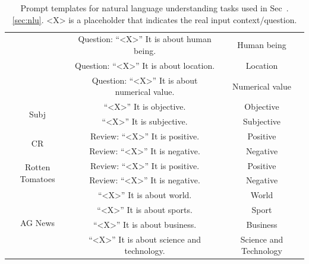 \begin{table}[h]
\begin{tabular}{ccc}
                                     & Question: ``\textless{}X\textgreater{}'' It is about human being.                      & Human being                      \\
                                     & Question: ``\textless{}X\textgreater{}'' It is about location.                         & Location                         \\
                                     & Question: ``\textless{}X\textgreater{}'' It is about numerical value.                  & Numerical value                  \\
    \midrule
    \multirow{2}{*}{Subj}            & ``\textless{}X\textgreater{}'' It is objective.                                        & Objective                        \\
                                     & ``\textless{}X\textgreater{}'' It is subjective.                                       & Subjective                       \\
    \midrule
    \multirow{2}{*}{CR}              & Review: ``\textless{}X\textgreater{}'' It is positive.                                 & Positive                         \\
                                     & Review: ``\textless{}X\textgreater{}'' It is negative.                                 & Negative                         \\
    \midrule
    \multirow{2}{*}{Rotten Tomatoes} & Review: ``\textless{}X\textgreater{}'' It is positive.                                 & Positive                         \\
                                     & Review: ``\textless{}X\textgreater{}'' It is negative.                                 & Negative                         \\
    \midrule
    \multirow{4}{*}{AG News}         & ``\textless{}X\textgreater{}'' It is about world.                                      & World                            \\
                                     & ``\textless{}X\textgreater{}'' It is about sports.                                     & Sport                            \\
                                     & ``\textless{}X\textgreater{}'' It is about business.                                   & Business                         \\
                                     & ``\textless{}X\textgreater{}'' It is about science and technology.                     & Science and Technology          \\
    \bottomrule                                    
    \end{tabular}
    \caption{Prompt templates for natural language understanding tasks used in Sec~.\ref{sec:nlu}. \textless{}X\textgreater{} is a placeholder that indicates the real input context/question.}
    \label{table:prompt}
\end{table}
